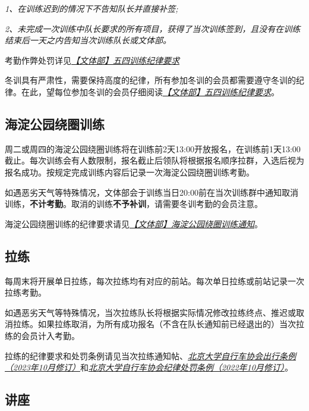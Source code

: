 \documentclass[UTF8]{ctexart}
\begin{document}
\textit{1、在训练迟到的情况下不告知队长并直接补签;}

\textit{2、未完成一次训练中队长要求的所有项目，获得了当次训练签到，且没有在训练结束后一天之内告知当次训练队长或文体部。}

考勤作弊处罚详见\href{https://chexie.net/bbs/content/index.php?bid=1\&tid=9576\&p=1}{\textit{【文体部】五四训练纪律要求}}

冬训具有严肃性，需要保持高度的纪律，所有参加冬训的会员都需要遵守冬训的纪律。在此，望每位参加冬训的会员仔细阅读\href{https://chexie.net/bbs/content/index.php?bid=1\&tid=9576\&p=1}{\textit{【文体部】五四训练纪律要求}}。


\subsection{海淀公园绕圈训练}

周二或周四的海淀公园绕圈训练将在训练前2天13:00开放报名，在训练前1天13:00截止。每次训练会有人数限制，报名截止后领队将根据报名顺序拉群，入选后视为报名成功。按规定完成训练内容后记录一次海淀公园绕圈训练考勤。

如遇恶劣天气等特殊情况，文体部会于训练当日20:00前在当次训练群中通知取消训练，\textbf{不计考勤}。取消的训练\textbf{不予补训}，请需要冬训考勤的会员注意。

海淀公园绕圈训练的纪律要求请见\href{https://www.chexie.net/bbs/content/?bid=1&tid=9743&p=1}{\textit{【文体部】海淀公园绕圈训练通知}}。

\subsection{拉练}

每周末将开展单日拉练，每次拉练均有对应的前站。每次单日拉练或前站记录一次拉练考勤。

如遇恶劣天气等特殊情况，当次拉练队长将根据实际情况修改拉练终点、推迟或取消拉练。如果拉练取消，为所有成功报名（不含在队长通知前已经退出的）当次拉练的会员计入考勤。

拉练的纪律要求和处罚条例请见当次拉练通知帖、\href{https://chexie.net/bbs/content/?bid=1&tid=9618&p=1}{\textit{北京大学自行车协会出行条例（2023年10月修订）}}和\href{https://chexie.net/bbs/content/?bid=1&tid=9260&p=1}{\textit{北京大学自行车协会纪律处罚条例（2022年10月修订）}}。

\subsection{讲座}
\end{document}
